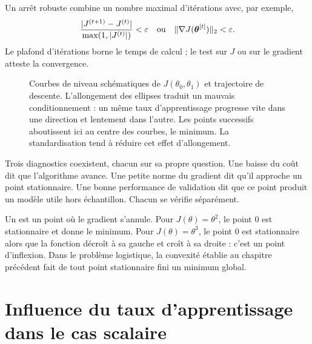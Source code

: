 Un arrêt robuste combine un nombre maximal d'itérations avec, par exemple,
\[
  \frac{|J^{(t+1)}-J^{(t)}|}{\max(1,|J^{(t)}|)}<\varepsilon
  \quad\text{ou}\quad \|\nabla J(\boldsymbol{\theta}^{[t]})\|_2<\varepsilon.
\]
Le plafond d'itérations borne le temps de calcul ; le test sur $J$ ou sur le
gradient atteste la convergence.

\begin{figure}[htbp]
\centering
{}
\caption{Courbes de niveau schématiques de $J(\theta_0,\theta_1)$ et trajectoire
de descente. L'allongement des ellipses traduit un mauvais conditionnement : un
même taux d'apprentissage progresse vite dans une direction et lentement dans
l'autre. Les points successifs aboutissent ici au centre des courbes, le minimum.
La standardisation tend à réduire cet effet d'allongement.}
\label{fig:contours}
\end{figure}

Trois diagnostics coexistent, chacun sur sa propre question. Une baisse du coût
dit que l'algorithme avance. Une petite norme du gradient dit qu'il approche un
point stationnaire. Une bonne performance de validation dit que ce point produit
un modèle utile hors échantillon. Chacun se vérifie séparément.

Un  est un point où le gradient s'annule. Pour
$J(\theta)=\theta^2$, le point $0$ est stationnaire et donne le minimum. Pour
$J(\theta)=\theta^3$, le point $0$ est stationnaire alors que la fonction décroît
à sa gauche et croît à sa droite : c'est un point d'inflexion. Dans le problème
logistique, la convexité établie au chapitre précédent fait de tout point
stationnaire fini un minimum global.

\section{Influence du taux d'apprentissage dans le cas scalaire}

